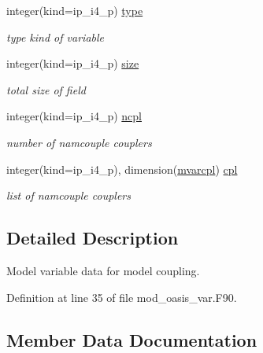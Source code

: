 \begin{DoxyCompactItemize}
integer(kind=ip\+\_\+i4\+\_\+p) \hyperlink{structmod__oasis__var_1_1prism__var__type_a944549d5fb1aebecc59ca5dbff9b3222}{type}
\begin{DoxyCompactList}\small\item\em type kind of variable \end{DoxyCompactList}\item 
integer(kind=ip\+\_\+i4\+\_\+p) \hyperlink{structmod__oasis__var_1_1prism__var__type_a13dac48e592591a9e06999aadaf1e6b7}{size}
\begin{DoxyCompactList}\small\item\em total size of field \end{DoxyCompactList}\item 
integer(kind=ip\+\_\+i4\+\_\+p) \hyperlink{structmod__oasis__var_1_1prism__var__type_a5e74e0f54df6c10c13569250bd616c94}{ncpl}
\begin{DoxyCompactList}\small\item\em number of namcouple couplers \end{DoxyCompactList}\item 
integer(kind=ip\+\_\+i4\+\_\+p), dimension(\hyperlink{namespacemod__oasis__var_a687d6dce16699f36ae3a67accfdba3a9}{mvarcpl}) \hyperlink{structmod__oasis__var_1_1prism__var__type_aca0fbd288bee74de5e08e77ad869039b}{cpl}
\begin{DoxyCompactList}\small\item\em list of namcouple couplers \end{DoxyCompactList}\end{DoxyCompactItemize}


\subsection{Detailed Description}
Model variable data for model coupling. 

Definition at line 35 of file mod\+\_\+oasis\+\_\+var.\+F90.



\subsection{Member Data Documentation}
\mbox{\label{structmod__oasis__var_1_1prism__var__type_aca0fbd288bee74de5e08e77ad869039b}} 
